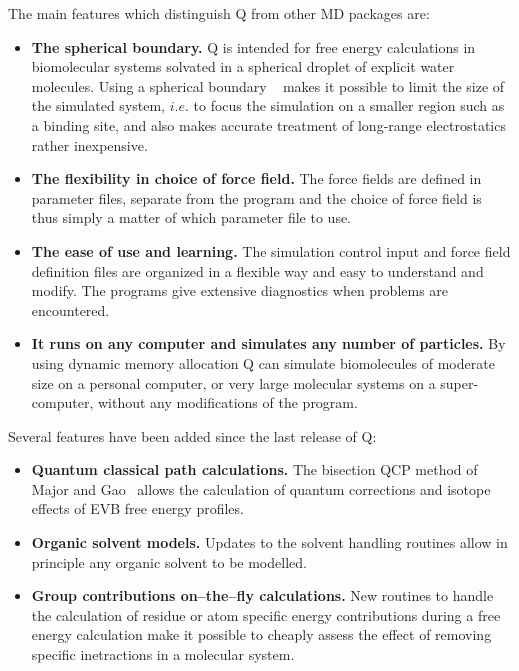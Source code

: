 \documentclass[a4paper,11pt]{article}
\let\origcite\cite
\def\cite#1{\unskip~\origcite{#1}}
\begin{document}
The main features which distinguish Q from other MD packages are:
\begin{itemize}
\item \textbf{The spherical  boundary.} Q is intended  for free energy
calculations in  biomolecular systems solvated in  a spherical droplet
of   explicit   water   molecules.    Using   a   spherical   boundary
\cite{Warshel1978a,Berkowitz1982,Brunger1984}  makes it  possible to
limit the size of the simulated system, $i.e.$ to focus the simulation
on a  smaller region such as  a binding site, and  also makes accurate
treatment of long-range electrostatics rather inexpensive.
\item \textbf{The  flexibility in  choice of  force field.}  The force
fields are defined  in parameter files, separate from  the program and
the choice of  force field is thus simply a  matter of which parameter
file to use.
\item \textbf{The  ease of use  and learning.} The  simulation control
input and force field definition files are organized in a flexible way
and  easy  to  understand  and modify.  The  programs  give  extensive
diagnostics when problems are encountered.
\item  \textbf{It runs  on any  computer and  simulates any  number of
particles.}   By  using  dynamic  memory  allocation  Q  can  simulate
biomolecules of  moderate size on  a personal computer, or  very large
molecular systems  on a  super-computer, without any  modifications of
the program.
\end{itemize}
Several features have been added since the last release of Q:


\begin{itemize}
	\item \textbf{Quantum classical path calculations.} The bisection QCP method of Major and Gao\cite{Major2007a,Gao2008}
		allows the calculation of quantum corrections and isotope effects of EVB free energy profiles.
	\item \textbf{Organic solvent models.} Updates to the solvent handling routines allow in principle any organic solvent
		to be modelled.
	\item \textbf{Group contributions on--the--fly calculations.} New routines to handle the calculation of residue or atom
		specific energy contributions during a free energy calculation make it possible to cheaply assess the 
		effect of removing specific inetractions in a molecular system.
\end{itemize}
\end{document}
